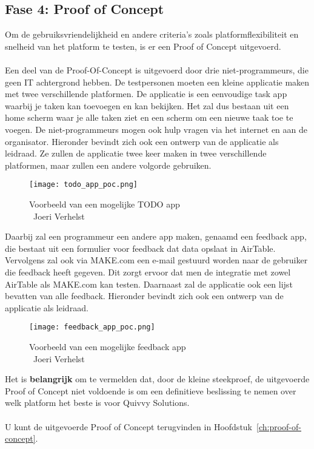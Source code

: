 \subsection*{Fase 4: Proof of Concept}%
\label{sec:proof-of-concept}
Om de gebruiksvriendelijkheid en andere criteria's zoals platformflexibiliteit en snelheid van het platform te testen, is er een Proof of Concept uitgevoerd. 
\\
\\
Een deel van de Proof-Of-Concept is uitgevoerd door drie niet-programmeurs, die geen IT achtergrond hebben. De testpersonen moeten
een kleine applicatie maken met twee verschillende platformen. De applicatie is een eenvoudige task app waarbij je taken kan toevoegen en kan bekijken.
Het zal dus bestaan uit een home scherm waar je alle taken ziet en een scherm om een nieuwe taak toe te voegen. De niet-programmeurs mogen ook hulp vragen via het internet en aan de organisator.
Hieronder bevindt zich ook een ontwerp van de applicatie als leidraad. Ze zullen de applicatie twee keer maken in twee verschillende platformen, maar zullen een andere volgorde gebruiken.
\\
\begin{figure}[H]
    \centering
    \texttt{[image: todo\_app\_poc.png]}
    \caption[Voorbeeld van een mogelijke TODO app]{Voorbeeld van een mogelijke TODO app\\\textcopyright\ Joeri Verhelst}
    \label{fig:todo_app}
\end{figure}

Daarbij zal een programmeur een andere app maken, genaamd een feedback app, die bestaat uit een formulier voor feedback dat data opslaat in AirTable.
Vervolgens zal ook via MAKE.com een e-mail gestuurd worden naar de gebruiker die feedback heeft gegeven.
Dit zorgt ervoor dat men de integratie met zowel AirTable als MAKE.com kan testen. Daarnaast zal de applicatie ook een lijst bevatten van alle feedback.
Hieronder bevindt zich ook een ontwerp van de applicatie als leidraad.

\begin{figure}[H]
    \centering
    \texttt{[image: feedback\_app\_poc.png]}
    \caption[Voorbeeld van een mogelijke feedback app]{Voorbeeld van een mogelijke feedback app\\\textcopyright\ Joeri Verhelst}
    \label{fig:feedback_app}
\end{figure}
Het is \textbf{belangrijk} om te vermelden dat, door de kleine steekproef, de uitgevoerde Proof of Concept niet voldoende is om een 
definitieve beslissing te nemen over welk platform het beste is voor Quivvy Solutions.
\\
\\
U kunt de uitgevoerde Proof of Concept terugvinden in Hoofdstuk~\ref{ch:proof-of-concept}.


